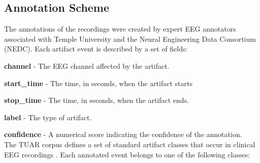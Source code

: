 \subsection{Annotation Scheme}

The annotations of the recordings were created by expert EEG annotators associated with Temple University and the Neural Engineering Data Consortium (NEDC). Each artifact event is described by a set of fields:

\textbf{channel} - The EEG channel affected by the artifact.

\textbf{start\_time} - The time, in seconds, when the artifact starts

\textbf{stop\_time} - The time, in seconds, when the artifact ends.

\textbf{label} - The type of artifact.

\textbf{confidence} - A numerical score indicating the confidence of the annotation.\\

The TUAR corpus defines a set of standard artifact classes that occur in clinical EEG recordings \cite{9353647}. Each annotated event belongs to one of the following classes:

